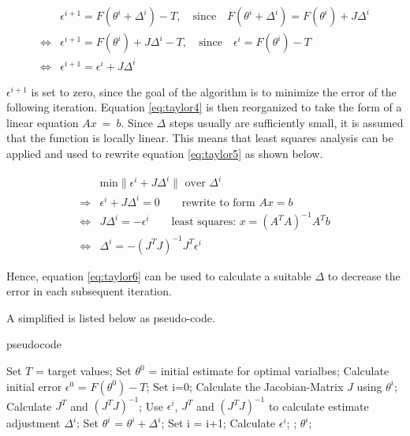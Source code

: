 \begin{align}
	& \epsilon^{i+1} = F(\theta^{i} + \Delta^{i}) - T, \quad \text{since} \quad F(\theta^{i} + \Delta^{i}) = F(\theta^{i}) + J \Delta^{i} \\
	\Leftrightarrow & \epsilon^{i+1} = F(\theta^{i}) + J \Delta^{i} - T, \quad \text{since} \quad \epsilon^{i} = F(\theta^{i}) - T \\
	\Leftrightarrow & \epsilon^{i+1} = \epsilon^{i} + J \Delta^{i} \label{eq:taylor4}
\end{align}

$\epsilon^{i+1}$ is set to zero, since the goal of the algorithm is to minimize the error of the following iteration. Equation \ref*{eq:taylor4}
is then reorganized to take the form of a linear equation $Ax~=~b$. Since $\Delta$ steps usually are sufficiently small, it is assumed that the function is locally
	linear. This means that least squares analysis can be applied and used to rewrite equation \ref*{eq:taylor5} as shown below.

\begin{align}
	&\text{min} \| \epsilon^{i} + J \Delta^{i} \|\text{ over $\Delta^{i}$} \\
	\Rightarrow & \epsilon^{i} + J \Delta^{i} = 0 \qquad \text{rewrite to form $Ax = b$} \\
	\Leftrightarrow & J \Delta^{i} = -\epsilon^{i} \qquad \text{least squares: } x = (A^T A)^{-1} A^T b \label{eq:taylor5} \\
	\Leftrightarrow & \Delta^{i} = - (J^T J)^{-1} J^T \epsilon^{i} \label{eq:taylor6}
\end{align}

Hence, equation \ref*{eq:taylor6} can be used to calculate a suitable $\Delta$ to decrease the error in each subsequent iteration.\newline

A simplified  is listed below as pseudo-code.

\begin{algorithm}
	\caption{ pseudocode}
	\begin{algorithmic}
		\State Set $T$ = target values;
		\State Set $\theta^{0}$ = initial estimate for optimal varialbes;
		\State Calculate initial error $\epsilon^0$ = $F(\theta^0) - T$;
		\State Set i=0;
			\State Calculate the Jacobian-Matrix $J$ using $\theta^i$;
			\State Calculate $J^{T}$ and  $(J^{T}J)^{-1}$;
			\State Use $\epsilon^i$, $J^{T}$ and  $(J^{T}J)^{-1}$ to calculate estimate adjustment $\Delta^i$;
			\State Set $\theta^{i}$ = $\theta^{i} + \Delta^i$;
			\State Set i = i+1;
			\State Calculate $\epsilon^i$;
		\EndWhile;
		\State {} $\theta^i$;
	\end{algorithmic}
\end{algorithm}


